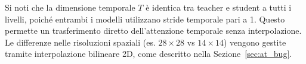 Si noti che la dimensione temporale $T$ è identica tra teacher e student a tutti i livelli, poiché entrambi i modelli utilizzano stride temporale pari a 1. Questo permette un trasferimento diretto dell'attenzione temporale senza interpolazione. Le differenze nelle risoluzioni spaziali (es. $28\times28$ vs $14\times14$) vengono gestite tramite interpolazione bilineare 2D, come descritto nella Sezione~\ref{sec:at_bug}.
